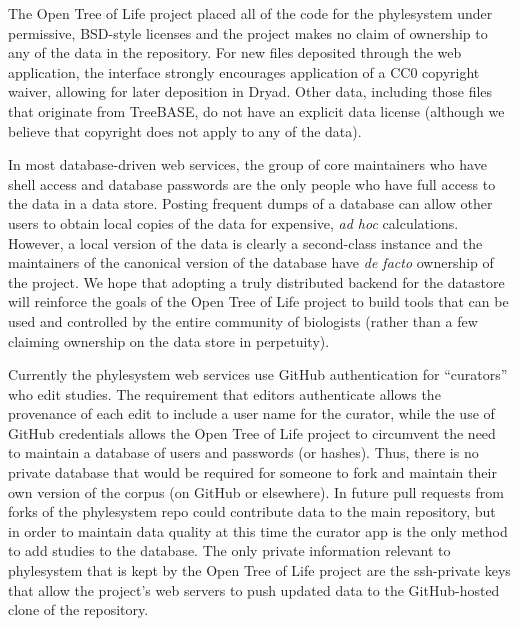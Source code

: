 \documentclass{bioinfo}
\newcommand{\ps}{phylesystem\xspace}
\newcommand{\otol}{Open Tree of Life\xspace}
\begin{document}
The \otol project placed all of the code for the \ps under permissive, BSD-style licenses and the
    project makes no claim of ownership to any of the data in the repository. 
For new files deposited through the web application, the interface strongly encourages application of a CC0 copyright waiver, 
    allowing for later deposition in Dryad. Other data, including those files that originate from TreeBASE,
    do not have an explicit data license (although we believe that copyright does not apply to any of the data).

In most database-driven web services, the group of core maintainers who have shell access and 
    database passwords are the only people who have full access to the data in a data store.
Posting frequent dumps of a database can allow other users to obtain local copies of the data 
    for expensive, {\em ad hoc} calculations.
However, a local version of the data is clearly a second-class instance and the maintainers of the 
    canonical version of the database have {\em de facto} ownership of the project.
We hope that adopting a truly distributed backend for the datastore will reinforce the goals
    of the \otol project to build tools that can be used and controlled by the entire community of biologists 
    (rather than a few claiming ownership on the data store in perpetuity).

Currently the \ps web services use GitHub authentication for ``curators'' who edit studies.
The requirement that editors authenticate allows the provenance of each edit to include 
    a user name for the curator, while the use of GitHub credentials allows the \otol project
    to circumvent the need to maintain a database of users and passwords (or hashes).
Thus, there is no private database that would be required for someone to fork and maintain their
    own version of the corpus (on GitHub or elsewhere).
In future pull requests from forks of the \ps repo could contribute data to the main repository,
   but in order to maintain data quality at this time the curator app is the only method to add studies to the database.
The only private information relevant to \ps that is kept by the \otol project are the ssh-private
    keys that allow the project's web servers to push updated data to the GitHub-hosted clone of the 
    repository.
\end{document}
